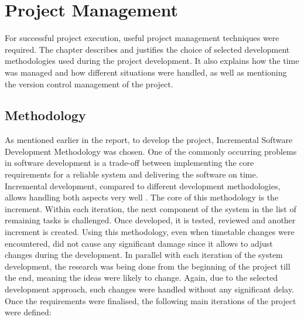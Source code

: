 \documentclass[10pt]{report}
\begin{document}



\chapter{Project Management}

For successful project execution, useful project management techniques were required. The chapter describes and justifies the choice of selected development methodologies used during the project development. It also explains how the time was managed and how different situations were handled, as well as mentioning the version control management of the project.

\section{Methodology} \label{methodology}

As mentioned earlier in the report, to develop the project, Incremental Software Development Methodology was chosen. One of the commonly occurring problems in software development is a trade-off between implementing the core requirements for a reliable system and delivering the software on time. Incremental development, compared to different development methodologies, allows handling both aspects very well \cite{incremental}. The core of this methodology is the increment. Within each iteration, the next component of the system in the list of remaining tasks is challenged. Once developed, it is tested, reviewed and another increment is created. Using this methodology, even when timetable changes were encountered, did not cause any significant damage since it allows to adjust changes during the development. In parallel with each iteration of the system development, the research was being done from the beginning of the project till the end, meaning the ideas were likely to change. Again, due to the selected development approach, such changes were handled without any significant delay. Once the requirements were finalised, the following main iterations of the project were defined:
\end{document}
